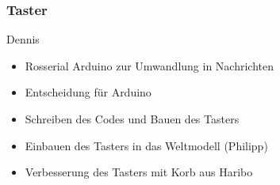 \documentclass[a4paper,12pt,headsepline]{scrartcl}
\begin{document}
			
	\subsubsection{Taster}
		Dennis\\
		\begin{itemize}
			\item Rosserial Arduino zur Umwandlung in Nachrichten
			\item Entscheidung für Arduino
			\item Schreiben des Codes und Bauen des Tasters
			\item Einbauen des Tasters in das Weltmodell (Philipp)
			\item Verbesserung des Tasters mit Korb aus Haribo
		\end{itemize}
	
\end{document}
